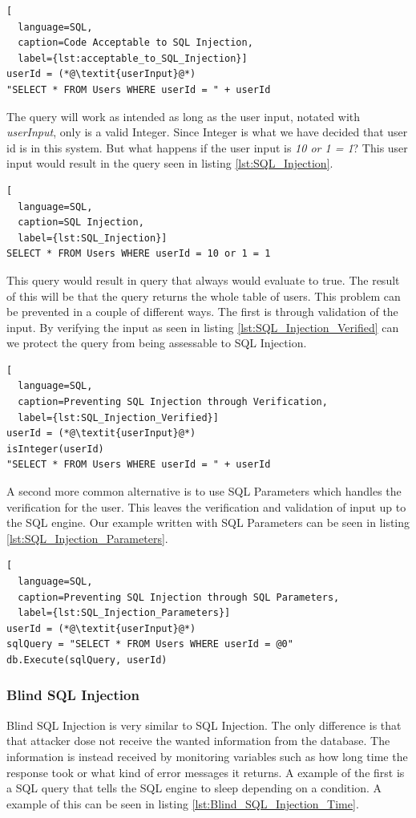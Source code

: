 \hfill
\begin{lstlisting}[
  language=SQL,
  caption=Code Acceptable to SQL Injection,
  label={lst:acceptable_to_SQL_Injection}]
userId = (*@\textit{userInput}@*)
"SELECT * FROM Users WHERE userId = " + userId
\end{lstlisting}
\hfill

The query will work as intended as long as the user input, notated with \textit{userInput}, only is a valid Integer. Since Integer is what we have decided that user id is in this system. But what happens if the user input is \textit{10 or 1 = 1}? This user input would result in the query seen in listing \ref{lst:SQL_Injection}.

\hfill
\begin{lstlisting}[
  language=SQL,
  caption=SQL Injection,
  label={lst:SQL_Injection}]
SELECT * FROM Users WHERE userId = 10 or 1 = 1
\end{lstlisting}
\hfill

This query would result in query that always would evaluate to true. The result of this will be that the query returns the whole table of users. This problem can be prevented in a couple of different ways. The first is through validation of the input. By verifying the input as seen in listing \ref{lst:SQL_Injection_Verified} can we protect the query from being assessable to SQL Injection.

\hfill
\begin{lstlisting}[
  language=SQL,
  caption=Preventing SQL Injection through Verification,
  label={lst:SQL_Injection_Verified}]
userId = (*@\textit{userInput}@*)
isInteger(userId)
"SELECT * FROM Users WHERE userId = " + userId
\end{lstlisting}
\hfill

A second more common alternative is to use SQL Parameters which handles the verification for the user. This leaves the verification and validation of input up to the SQL engine. Our example written with SQL Parameters can be seen in listing \ref{lst:SQL_Injection_Parameters}.

\hfill
\begin{lstlisting}[
  language=SQL,
  caption=Preventing SQL Injection through SQL Parameters,
  label={lst:SQL_Injection_Parameters}]
userId = (*@\textit{userInput}@*)
sqlQuery = "SELECT * FROM Users WHERE userId = @0"
db.Execute(sqlQuery, userId)
\end{lstlisting}


\subsubsection{Blind SQL Injection}
Blind SQL Injection is very similar to SQL Injection. The only difference is that that attacker dose not receive the wanted information from the database. The information is instead received by monitoring variables such as how long time the response took or what kind of error messages it returns. A example of the first is a SQL query that tells the SQL engine to sleep depending on a condition. A example of this can be seen in listing \ref{lst:Blind_SQL_Injection_Time}. \parencite{JustinClarke-Salt2009SIAa, Secure_Web} 


